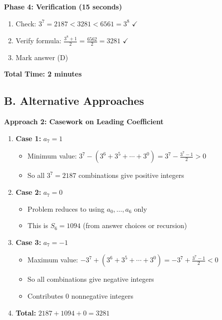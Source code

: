 \documentclass[12pt]{article}
\begin{document}
\begin{roadmapbox}
\textbf{Phase 4: Verification (15 seconds)}
\begin{enumerate}
    \item Check: $3^7 = 2187 < 3281 < 6561 = 3^8$ $\checkmark$
    \item Verify formula: $\frac{3^8+1}{2} = \frac{6562}{2} = 3281$ $\checkmark$
    \item Mark answer (D)
\end{enumerate}

\textbf{Total Time: 2 minutes}

\subsection*{B. Alternative Approaches}

\textbf{Approach 2: Casework on Leading Coefficient}
\begin{enumerate}
    \item \textbf{Case 1:} $a_7 = 1$
    \begin{itemize}
        \item Minimum value: $3^7 - (3^6+3^5+\cdots+3^0) = 3^7 - \frac{3^7-1}{2} > 0$
        \item So all $3^7 = 2187$ combinations give positive integers
    \end{itemize}
    \item \textbf{Case 2:} $a_7 = 0$
    \begin{itemize}
        \item Problem reduces to using $a_0, \ldots, a_6$ only
        \item This is $S_6 = 1094$ (from answer choices or recursion)
    \end{itemize}
    \item \textbf{Case 3:} $a_7 = -1$
    \begin{itemize}
        \item Maximum value: $-3^7 + (3^6+3^5+\cdots+3^0) = -3^7 + \frac{3^7-1}{2} < 0$
        \item So all combinations give negative integers
        \item Contributes 0 nonnegative integers
    \end{itemize}
    \item \textbf{Total:} $2187 + 1094 + 0 = 3281$
\end{enumerate}


\end{roadmapbox}
\end{document}
